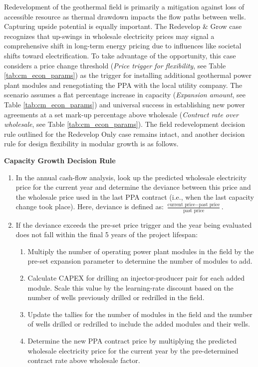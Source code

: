Redevelopment of the geothermal field is primarily a mitigation against loss of accessible resource as thermal drawdown impacts the flow paths between wells. Capturing upside potential is equally important. The Redevelop \& Grow case recognizes that up-swings in wholesale electricity prices may signal a comprehensive shift in long-term energy pricing due to influences like societal shifts toward electrification. To take advantage of the opportunity, this case considers a price change threshold (\textit{Price trigger for flexibility}, see Table \ref{tab:cm_econ_params}) as the trigger for installing additional geothermal power plant modules and renegotiating the PPA with the local utility company. The scenario assumes a flat percentage increase in capacity (\textit{Expansion amount}, see Table \ref{tab:cm_econ_params}) and universal success in establishing new power agreements at a set mark-up percentage above wholesale (\textit{Contract rate over wholesale}, see Table \ref{tab:cm_econ_params}). The field redevelopment decision rule outlined for the Redevelop Only case remains intact, and another decision rule for design flexibility in modular growth is as follows.

\noindent
\textbf{Capacity Growth Decision Rule}\label{ch4:dr_grow}
\begin{enumerate}
    \item In the annual cash-flow analysis, look up the predicted wholesale electricity price for the current year and determine the deviance between this price and the wholesale price used in the last PPA contract (i.e., when the last capacity change took place). Here, deviance is defined as: \(\frac{\text{current price} - \text{past price}}{\text{past price}}\).
    \item If the deviance exceeds the pre-set price trigger and the year being evaluated does not fall within the final 5 years of the project lifespan:
    \begin{enumerate}
        \item Multiply the number of operating power plant modules in the field by the pre-set expansion parameter to determine the number of modules to add.
        \item Calculate CAPEX for drilling an injector-producer pair for each added module. Scale this value by the learning-rate discount based on the number of wells previously drilled or redrilled in the field.
        \item Update the tallies for the number of modules in the field and the number of wells drilled or redrilled to include the added modules and their wells.
        \item Determine the new PPA contract price by multiplying the predicted wholesale electricity price for the current year by the pre-determined contract rate above wholesale factor.
    \end{enumerate}
\end{enumerate}

